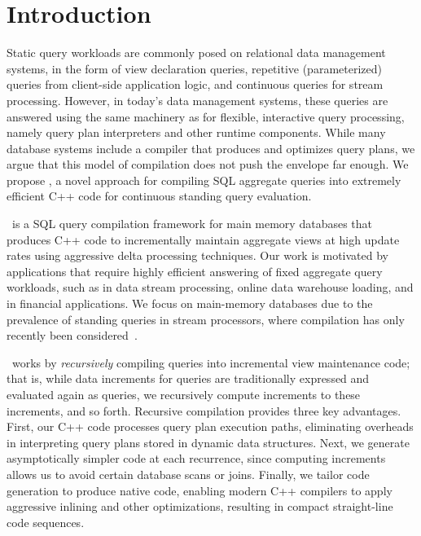 \section{Introduction}
Static query workloads are commonly posed on relational data management systems,
in the form of view declaration queries, repetitive (parameterized) queries from
client-side application logic, and continuous queries for stream processing.
However, in today's data management systems, these queries are answered using the
same machinery as for flexible, interactive query processing, namely query plan
interpreters and other runtime components. While many database systems include a
compiler that produces and optimizes query plans, we argue that this model of
compilation does not push the envelope far enough. We propose \compiler, a novel
approach for compiling SQL aggregate queries into extremely efficient C++ code
for continuous standing query evaluation.

\compiler\ is a SQL query compilation framework for main memory databases that
produces C++ code to incrementally maintain aggregate views at high update rates
using aggressive delta processing techniques. Our work is motivated by
applications that require highly efficient answering of fixed aggregate query
workloads, such as in data stream processing, online data warehouse loading, and
in financial applications. We focus on main-memory databases due to the
prevalence of standing queries in stream processors, where compilation has
only recently been considered~\cite{gedik-sigmod:08,sb-patent}.

\compiler\ works by {\em recursively}\/ compiling queries into incremental view
maintenance code; that is, while data increments for queries are traditionally
expressed and evaluated again as queries, we recursively compute increments to
these increments, and so forth. Recursive compilation provides three key
advantages. First, our C++ code processes query plan execution paths, eliminating
overheads in interpreting query plans stored in dynamic data structures. Next, we
generate asymptotically simpler code at each recurrence, since computing
increments allows us to avoid certain database scans or joins. Finally, we tailor
code generation to produce native code, enabling modern C++ compilers to apply
aggressive inlining and other optimizations, resulting in compact straight-line
code sequences.


